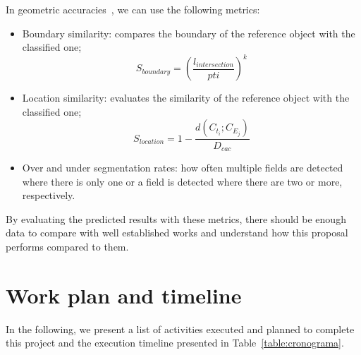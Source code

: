 \documentclass[12pt]{article}
\begin{document}
In geometric accuracies~\citep{lizarazo2014}, we can use the following metrics:
\begin{itemize}
\item Boundary similarity: compares the boundary of the reference object with the classified one;
\[
S_{boundary}=\left({\frac{l_{intersection}}{pti}}\right)^k
\]
\item Location similarity: evaluates the similarity of the reference object with the classified one;
\[ 
S_{location}=1-\frac{d(C_{t_i};C_{E_j})}{D_{cac}}
\]
\item Over and under segmentation rates: how often multiple fields are detected where there is only one or a field is detected where there are two or more, respectively.
\end{itemize}

By evaluating the predicted results with these metrics, there should be enough data to compare with well established works and understand how this proposal performs compared to them.

\section{Work plan and timeline}\label{section:planotrabalho}

In the following, we present a list of activities executed and planned to complete this project and the execution timeline presented in Table~\ref{table:cronograma}.
\end{document}

